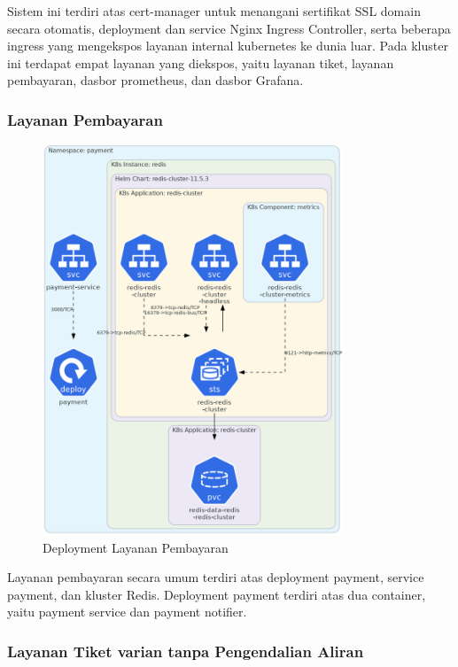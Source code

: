 Sistem ini terdiri atas cert-manager untuk menangani sertifikat SSL domain secara otomatis, deployment dan service Nginx Ingress Controller, serta beberapa ingress yang mengekspos layanan internal kubernetes ke dunia luar. Pada kluster ini terdapat empat layanan yang diekspos, yaitu layanan tiket, layanan pembayaran, dasbor prometheus, dan dasbor Grafana.

\pagebreak

\subsubsection{Layanan Pembayaran}

\begin{figure}[htbp]
    \centering
    \includegraphics[width=0.8\textwidth]{resources/chapter-4/payment.png}
    \caption{Deployment Layanan Pembayaran}
    \label{fig:deployment-payment}
\end{figure}

Layanan pembayaran secara umum terdiri atas deployment payment, service payment, dan kluster Redis. Deployment payment terdiri atas dua container, yaitu payment service dan payment notifier.

\pagebreak

\subsubsection{Layanan Tiket varian tanpa Pengendalian Aliran}

